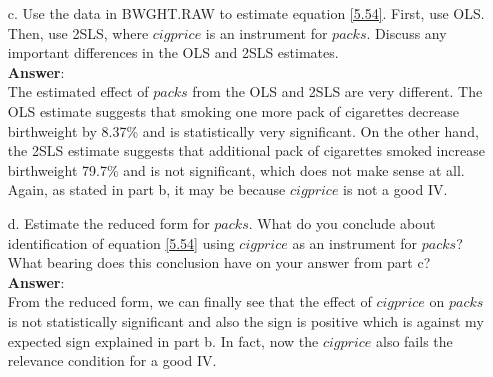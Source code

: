 \documentclass[10pt]{article}
\begin{document}
\begin{enumerate}
\item[c.] Use the data in BWGHT.RAW to estimate equation \eqref{5.54}. First, use OLS. Then, use 2SLS, where $cigprice$ is an instrument for $packs$. Discuss any important differences in the OLS and 2SLS estimates.
\\ \textbf{Answer}:\\

The estimated effect of $packs$ from the OLS and 2SLS are very different. The OLS estimate suggests that smoking one more pack of cigarettes decrease birthweight by 8.37\% and is statistically very significant. On the other hand, the 2SLS estimate suggests that additional pack of cigarettes smoked increase birthweight 79.7\% and is not significant, which does not make sense at all. Again, as stated in part b, it may be because $cigprice$ is not a good IV.
\item[d.] Estimate the reduced form for $packs$. What do you conclude about identification of equation \eqref{5.54} using $cigprice$ as an instrument for $packs$? What bearing does this conclusion have on your answer from part c?
\\ \textbf{Answer}:\\

From the reduced form, we can finally see that the effect of $cigprice$ on $packs$ is not statistically significant and also the sign is positive which is against my expected sign explained in part b. In fact, now the $cigprice$ also fails the relevance condition for a good IV. 
\end{enumerate}
\end{document}

